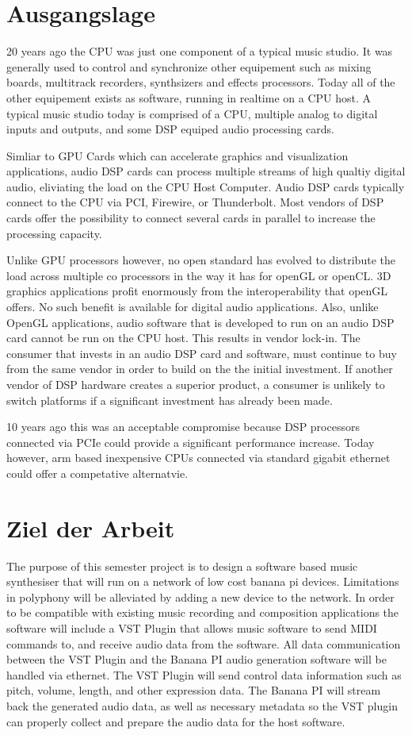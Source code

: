 \section{Ausgangslage}

20 years ago the CPU was just one component of a typical music studio. It was generally used to control and synchronize other equipement such as mixing boards, multitrack recorders, synthsizers and effects processors. Today all of the other equipement exists as software, running in realtime on a CPU host. A typical music studio today is comprised of a CPU, multiple analog to digital inputs and outputs, and some DSP equiped audio processing cards.

Simliar to GPU Cards which can accelerate graphics and visualization applications, audio DSP cards can process multiple streams of high qualtiy digital audio, eliviating the load on the CPU Host Computer. Audio DSP cards typically connect to the CPU via PCI, Firewire, or Thunderbolt. Most vendors of DSP cards offer the possibility to connect several cards in parallel to increase the processing capacity.

Unlike GPU processors however, no open standard has evolved to distribute the load across multiple co processors in the way it has for openGL or openCL. 3D graphics applications profit enormously from the interoperability that openGL offers. No such benefit is available for digital audio applications. Also, unlike OpenGL applications, audio software that is developed to run on an audio DSP card cannot be run on the CPU host. This results in vendor lock-in. The consumer that invests in an audio DSP card and software, must continue to buy from the same vendor in order to build on the the initial investment. If another vendor of DSP hardware creates a superior product, a consumer is unlikely to switch platforms if a significant investment has already been made.

10 years ago this was an acceptable compromise because DSP processors connected via PCIe could provide a significant performance increase. Today however, arm based inexpensive CPUs connected via standard gigabit ethernet could offer a competative alternatvie. 

\section{Ziel der Arbeit}

The purpose of this semester project is to design a software based music synthesiser that will run on a network of low cost banana pi devices. Limitations in polyphony will be alleviated by adding a new device to the network. In order to be compatible with existing music recording and composition applications the software will include a VST Plugin that allows music software to send MIDI commands to, and receive audio data from the software. All data communication between the VST Plugin and the Banana PI audio generation software will be handled via ethernet. The VST Plugin will send control data information such as pitch, volume, length, and other expression data. The Banana PI will stream back the generated audio data, as well as necessary metadata so the VST plugin can properly collect and prepare the audio data for the host software.

